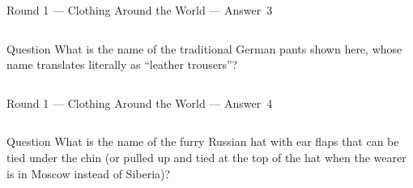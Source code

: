 \documentclass[11pt]{beamer}
\begin{document}
\begin{frame}[t]{Round 1 --- Clothing Around the World --- \mbox{Answer 3}}
\vspace{-0.5em}
\begin{columns}[T,totalwidth=\linewidth]
\begin{column}{0.32\linewidth}
\begin{block}{Question}
What is the name of the traditional German pants shown here, whose name translates literally as ``leather trousers''?
\end{block}
\end{column}
\begin{column}{0.65\linewidth}
\begin{center}
\texttt{[image: \{Images/lederhosen]}.jpg}
\end{center}
\end{column}
\end{columns}
\end{frame}
\begin{frame}[t]{Round 1 --- Clothing Around the World --- \mbox{Answer 4}}
\vspace{-0.5em}
\begin{columns}[T,totalwidth=\linewidth]
    \begin{column}{0.6\linewidth}
    \begin{block}{Question}
    What is the name of the furry Russian hat with ear flaps that can be tied under the chin (or pulled up and tied at the top of the hat when the wearer is in Moscow instead of Siberia)?
    \end{block}
    \end{column}
    \begin{column}{0.38\linewidth}
    \begin{center}
    \texttt{[image: \{Images/ushanka]}.jpeg}
    \end{center}
    \end{column}
\end{columns}

\end{frame}
\end{document}
